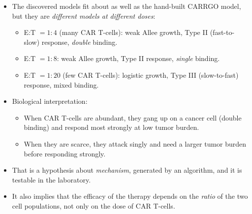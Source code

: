 \documentclass[20pt]{extarticle}
\begin{document}
\begin{itemize}
\item The discovered models fit about as well as the hand-built CARRGO model, but they are \emph{different models at different doses}:
	\begin{itemize}
	\item E:T $=1:4$ (many CAR T-cells): weak Allee growth, Type II (fast-to-slow) response, \emph{double} binding.
	\item E:T $=1:8$: weak Allee growth, Type II response, \emph{single} binding.
	\item E:T $=1:20$ (few CAR T-cells): logistic growth, Type III (slow-to-fast) response, mixed binding.
	\end{itemize}
\item Biological interpretation: 
	\begin{itemize}
	\item When CAR T-cells are abundant, they gang up on a cancer cell (double binding) and respond most strongly at low tumor burden.
	\item When they are scarce, they attack singly and need a larger tumor burden before responding strongly.
	\end{itemize}
\item That is a hypothesis about \emph{mechanism}, generated by an algorithm, and it is testable in the laboratory.
\item It also implies that the efficacy of the therapy depends on the \emph{ratio} of the two cell populations, not only on the dose of CAR T-cells.
\end{itemize}
\end{document}
